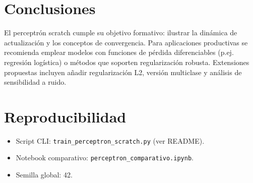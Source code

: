 \section{Conclusiones}
El perceptrón scratch cumple su objetivo formativo: ilustrar la dinámica de actualización y los conceptos de convergencia. Para aplicaciones productivas se recomienda emplear modelos con funciones de pérdida diferenciables (p.ej. regresión logística) o métodos que soporten regularización robusta. Extensiones propuestas incluyen añadir regularización L2, versión multiclase y análisis de sensibilidad a ruido.

\section{Reproducibilidad}
\begin{itemize}
	\item Script CLI: \texttt{train\_perceptron\_scratch.py} (ver README).
	\item Notebook comparativo: \texttt{perceptron\_comparativo.ipynb}.
	\item Semilla global: 42.
\end{itemize}


